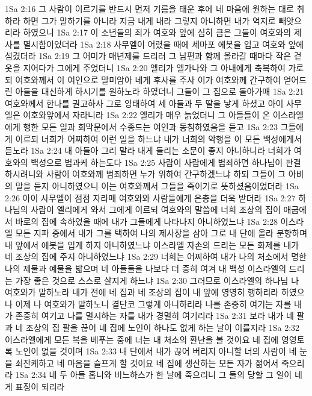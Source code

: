 1Sa 2:16  그 사람이 이르기를 반드시 먼저 기름을 태운 후에 네 마음에 원하는 대로 취하라 하면 그가 말하기를 아니라 지금 내게 내라 그렇지 아니하면 내가 억지로 빼앗으리라 하였으니
1Sa 2:17  이 소년들의 죄가 여호와 앞에 심히 큼은 그들이 여호와의 제사를 멸시함이었더라
1Sa 2:18  사무엘이 어렸을 때에 세마포 에봇을 입고 여호와 앞에 섬겼더라
1Sa 2:19  그 어미가 매년제를 드리러 그 남편과 함께 올라갈 때마다 작은 겉옷을 지어다가 그에게 주었더니
1Sa 2:20  엘리가 엘가나와 그 아내에게 축복하여 가로되 여호와께서 이 여인으로 말미암아 네게 후사를 주사 이가 여호와께 간구하여 얻어드린 아들을 대신하게 하시기를 원하노라 하였더니 그들이 그 집으로 돌아가매
1Sa 2:21  여호와께서 한나를 권고하사 그로 잉태하여 세 아들과 두 딸을 낳게 하셨고 아이 사무엘은 여호와앞에서 자라니라
1Sa 2:22  엘리가 매우 늙었더니 그 아들들이 온 이스라엘에게 행한 모든 일과 회막문에서 수종드는 여인과 동침하였음을 듣고
1Sa 2:23  그들에게 이르되 너희가 어찌하여 이런 일을 하느냐 내가 너희의 악행을 이 모든 백성에게서 듣노라
1Sa 2:24  내 아들아 그리 말라 내게 들리는 소문이 좋지 아니하니라 너희가 여호와의 백성으로 범과케 하는도다
1Sa 2:25  사람이 사람에게 범죄하면 하나님이 판결하시려니와 사람이 여호와께 범죄하면 누가 위하여 간구하겠느냐 하되 그들이 그 아비의 말을 듣지 아니하였으니 이는 여호와께서 그들을 죽이기로 뜻하셨음이었더라
1Sa 2:26  아이 사무엘이 점점 자라매 여호와와 사람들에게 은총을 더욱 받더라
1Sa 2:27  하나님의 사람이 엘리에게 와서 그에게 이르되 여호와의 말씀에 너희 조상의 집이 애굽에서 바로의 집에 속하였을 때에 내가 그들에게 나타나지 아니하였느냐
1Sa 2:28  이스라엘 모든 지파 중에서 내가 그를 택하여 나의 제사장을 삼아 그로 내 단에 올라 분향하며 내 앞에서 에봇을 입게 하지 아니하였느냐 이스라엘 자손의 드리는 모든 화제를 내가 네 조상의 집에 주지 아니하였느냐
1Sa 2:29  너희는 어찌하여 내가 나의 처소에서 명한 나의 제물과 예물을 밟으며 네 아들들을 나보다 더 중히 여겨 내 백성 이스라엘의 드리는 가장 좋은 것으로 스스로 살지게 하느냐
1Sa 2:30  그러므로 이스라엘의 하나님 나 여호와가 말하노라 내가 전에 네 집과 네 조상의 집이 내 앞에 영영히 행하리라 하였으나 이제 나 여호와가 말하노니 결단코 그렇게 아니하리라 나를 존중히 여기는 자를 내가 존중히 여기고 나를 멸시하는 자를 내가 경멸히 여기리라
1Sa 2:31  보라 내가 네 팔과 네 조상의 집 팔을 끊어 네 집에 노인이 하나도 없게 하는 날이 이를지라
1Sa 2:32  이스라엘에게 모든 복을 베푸는 중에 너는 내 처소의 환난을 볼 것이요 네 집에 영영토록 노인이 없을 것이며
1Sa 2:33  내 단에서 내가 끊어 버리지 아니할 너의 사람이 네 눈을 쇠잔케하고 네 마음을 슬프게 할 것이요 네 집에 생산하는 모든 자가 젊어서 죽으리라
1Sa 2:34  네 두 아들 홉니와 비느하스가 한 날에 죽으리니 그 둘의 당할 그 일이 네게 표징이 되리라
